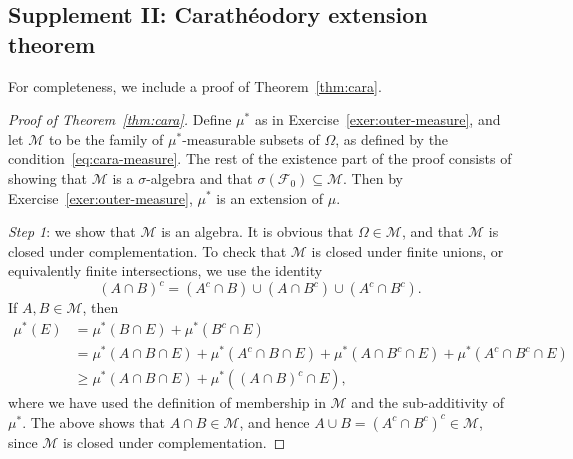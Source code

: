 \subsection{Supplement II: Carath\'{e}odory extension theorem}
\label{subsec:supple2}
For completeness, we include a proof of Theorem~\ref{thm:cara}.

\begin{proof}[Proof of Theorem~\ref{thm:cara}]
    Define $\mu^*$ as in Exercise~\ref{exer:outer-measure}, and let $\mathcal{M}$ to be the family of $\mu^*$-measurable subsets of $\Omega$, as defined by the condition~\eqref{eq:cara-measure}. The rest of the existence part of the proof consists of showing that $\mathcal{M}$ is a $\sigma$-algebra and that $\sigma(\mathcal{F}_0)\subseteq\mathcal{M}$. Then by Exercise~\ref{exer:outer-measure}, $\mu^*$ is an extension of $\mu$.

    \emph{Step 1}: we show that $\mathcal{M}$ is an algebra. It is obvious that $\Omega\in\mathcal{M}$, and that $\mathcal{M}$ is closed under complementation. To check that $\mathcal{M}$ is closed under finite unions, or equivalently finite intersections, we use the identity
    \begin{equation*}
        (A\cap B)^c = (A^c\cap B)\cup (A\cap B^c)\cup (A^c\cap B^c).
    \end{equation*}
    If $A,B\in\mathcal{M}$, then
    \begin{align*}
        \mu^*(E) &= \mu^*(B\cap E) + \mu^*(B^c\cap E) \\
        &= \mu^*(A\cap B\cap E) + \mu^*(A^c\cap B\cap E) + \mu^*(A\cap B^c\cap E) + \mu^*(A^c\cap B^c\cap E) \\
        &\ge \mu^*(A\cap B\cap E) + \mu^*((A\cap B)^c\cap E),
    \end{align*}
    where we have used the definition of membership in $\mathcal{M}$ and the sub-additivity of $\mu^*$. The above shows that $A\cap B\in\mathcal{M}$, and hence $A\cup B = (A^c\cap B^c)^c\in\mathcal{M}$, since $\mathcal{M}$ is closed under complementation.


\end{proof}
